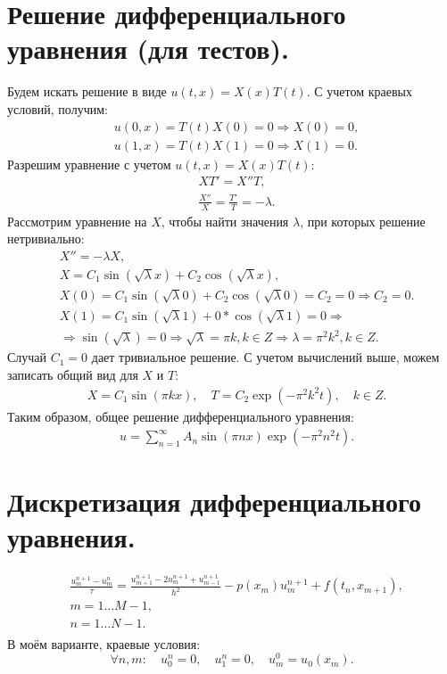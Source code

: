 \documentclass[14pt,a4paper]{extarticle}
\newcommand{\1}{\mathbbm{1}}
\begin{document}
\section{Решение дифференциального уравнения (для тестов).}
Будем искать решение в виде $u(t, x) = X(x) T(t)$. С учетом краевых условий, получим:
\begin{align*} 
    & u(0, x) = T(t) X(0) = 0 \Rightarrow X(0) = 0, \\
    & u(1, x) = T(t) X(1) = 0 \Rightarrow X(1) = 0.
\end{align*}
Разрешим уравнение с учетом $u(t, x) = X(x) T(t)$:
\begin{align*} 
    & X T' = X'' T, \\
    & \frac{X''}{X} = \frac{T'}{T} = -\lambda.
\end{align*}
Рассмотрим уравнение на $X$, чтобы найти значения $\lambda$, при которых решение нетривиально:
\begin{align*} 
    & X'' = -\lambda X, \\
    & X = C_1 \sin(\sqrt{\lambda} x) + C_2 \cos (\sqrt{\lambda} x), \\
    & X(0) = C_1 \sin(\sqrt{\lambda} 0) + C_2 \cos (\sqrt{\lambda} 0) = C_2 = 0 \Rightarrow C_2 = 0. \\
    & X(1) = C_1 \sin(\sqrt{\lambda} 1) + 0 * \cos (\sqrt{\lambda} 1)= 0 \Rightarrow \\ 
    & \Rightarrow \sin(\sqrt{\lambda}) = 0 \Rightarrow \sqrt{\lambda} = \pi k, k \in Z \Rightarrow \lambda = \pi^2 k^2, k \in Z.
\end{align*}
Случай $C_1 = 0$ дает тривиальное решение. С учетом вычислений выше, можем записать общий вид для $X$ и $T$:
\begin{align*} 
    & X = C_1 \sin(\pi k x), \quad T = C_2 \exp{(-\pi^2 k^2 t)}, \quad k \in Z.
\end{align*}
Таким образом, общее решение дифференциального уравнения:
\begin{align*} 
    & u = \sum_{n = 1}^{\infty} A_n \sin(\pi n x) \exp{(-\pi^2 n^2 t)}.
\end{align*}



\section{Дискретизация дифференциального уравнения.}
\begin{align} \label{scheme1}
    &\frac{u_m^{n+1} - u_m^n}{\tau} = \frac{u_{m+1}^{n+1} - 2 u_{m}^{n+1} + u_{m-1}^{n+1}}{h^2} - p(x_m) u_m^{n+1} + f(t_{n}, x_{m+1}),\\ 
    & m = 1 \ldots M-1, \\
    & n = 1 \ldots N-1. \\
\end{align}
В моём варианте, краевые условия:
\begin{equation} \label{schemeedge}
    \forall n, m: \quad u_0^{n} = 0, \quad u_1^{n} = 0, \quad u_m^{0} = u_0(x_m). 
\end{equation}
\end{document}
